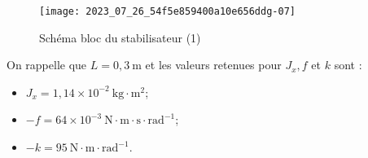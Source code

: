 \ifprof
\else
\begin{figure}[!h]
\centering
\texttt{[image: 2023\_07\_26\_54f5e859400a10e656ddg-07]}
\caption{\label{fig_ccspsi2022:10}Schéma bloc du stabilisateur (1)}
\end{figure}

On rappelle que $L=0,3 \mathrm{~m}$ et les valeurs retenues pour $J_{x}, f$ et $k$ sont :

\begin{itemize}
  \item $J_{x}=1,14 \times 10^{-2} \mathrm{~kg} \cdot \mathrm{m}^{2}$;

  \item $-f=64 \times 10^{-3} \mathrm{~N} \cdot \mathrm{m} \cdot \mathrm{s} \cdot \mathrm{rad}^{-1}$;

  \item $-k=95 \mathrm{~N} \cdot \mathrm{m} \cdot \mathrm{rad}^{-1}$.
\end{itemize}
\fi

